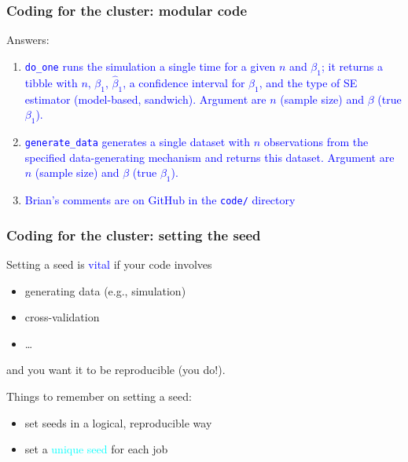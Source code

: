 \documentclass[12pt, 
hyperref={colorlinks=true, linkcolor=BlueViolet, urlcolor=BlueViolet},dvipsnames]{beamer}
\begin{document}
\begin{frame}
\frametitle{Coding for the cluster: modular code}

Answers: \vspace{-0.3cm}
\begin{enumerate}
\item \textcolor{blue}{\texttt{do\_one} runs the simulation a single time for a given $n$ and $\beta_1$; it returns a tibble with $n$, $\beta_1$, $\hat{\beta}_1$, a confidence interval for $\beta_1$, and the type of SE estimator (model-based, sandwich). Argument are $n$ (sample size) and $\beta$ (true $\beta_1$).}
\item \textcolor{blue}{\texttt{generate\_data} generates a single dataset with $n$ observations from the specified data-generating mechanism and returns this dataset. Argument are $n$ (sample size) and $\beta$ (true $\beta_1$).}
\item \textcolor{blue}{Brian's comments are on GitHub in the \texttt{code/} directory}
\end{enumerate}

\end{frame}

\begin{frame}
\frametitle{Coding for the cluster: setting the seed}

Setting a seed is \textcolor{blue}{vital} if your code involves \vspace{-0.3cm} \pause
\begin{itemize}
\item generating data (e.g., simulation) \pause
\item cross-validation \pause
\item \dots \pause
\end{itemize}
and you want it to be reproducible (you do!). \pause

Things to remember on setting a seed: \vspace{-0.3cm} \pause
\begin{itemize}
\item set seeds in a logical, reproducible way \pause
\item set a \textcolor{cyan}{unique seed} for each job \pause
\end{itemize}

\end{frame}
\end{document}
